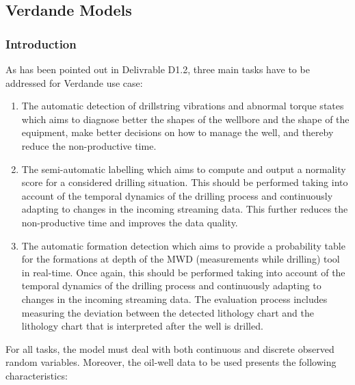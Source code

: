 \subsection{Verdande Models}

\subsubsection*{Introduction}

As has been pointed out in Delivrable D1.2, three main tasks have to be addressed for Verdande use case:

\begin{enumerate}

\item The automatic detection of drillstring vibrations and abnormal torque states which aims to diagnose better the shapes of the wellbore and the shape of the equipment, make better decisions on how to manage the well, and thereby reduce the non-productive time.

\item The semi-automatic labelling which aims to compute and output a normality score for a considered drilling situation. This should be performed taking into account of the temporal dynamics of the drilling process and continuously adapting to changes in the incoming streaming data. This further reduces the non-productive time and improves the data quality.

\item The automatic formation detection which aims to provide a probability table for the formations at depth of the MWD (measurements while drilling) tool in real-time. Once again, this should be performed taking into account of the temporal dynamics of the drilling process and continuously adapting to changes in the incoming streaming data. The evaluation process includes measuring the deviation between the detected lithology chart and the lithology chart that is interpreted after the well is drilled.

\end{enumerate}

For all tasks, the model must deal with both continuous and discrete observed random variables. Moreover, the oil-well data to be used presents the following characteristics: 

